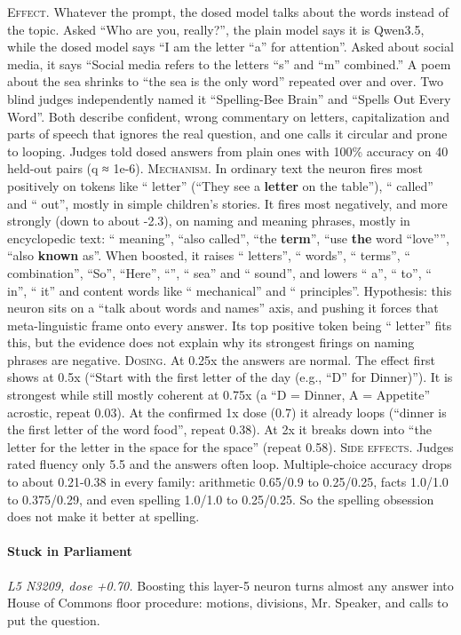 \noindent\textsc{Effect.} Whatever the prompt, the dosed model talks about the words instead of the topic. Asked “Who are you, really?”, the plain model says it is Qwen3.5, while the dosed model says “I am the letter “a” for attention”. Asked about social media, it says “Social media refers to the letters “s” and “m” combined.” A poem about the sea shrinks to “the sea is the only word” repeated over and over. Two blind judges independently named it “Spelling-Bee Brain” and “Spells Out Every Word”. Both describe confident, wrong commentary on letters, capitalization and parts of speech that ignores the real question, and one calls it circular and prone to looping. Judges told dosed answers from plain ones with 100\% accuracy on 40 held-out pairs (q ≈ 1e-6). \textsc{Mechanism.} In ordinary text the neuron fires most positively on tokens like “ letter” (“They see a\textbf{ letter} on the table”), “ called” and “ out”, mostly in simple children's stories. It fires most negatively, and more strongly (down to about -2.3), on naming and meaning phrases, mostly in encyclopedic text: “ meaning”, “also called”, “the\textbf{ term}”, “use\textbf{ the} word “love””, “also\textbf{ known} as”. When boosted, it raises “ letters”, “ words”, “ terms”, “ combination”, “So”, “Here”, “”, “ sea” and “ sound”, and lowers “ a”, “ to”, “ in”, “ it” and content words like “ mechanical” and “ principles”. Hypothesis: this neuron sits on a “talk about words and names” axis, and pushing it forces that meta-linguistic frame onto every answer. Its top positive token being “ letter” fits this, but the evidence does not explain why its strongest firings on naming phrases are negative. \textsc{Dosing.} At 0.25x the answers are normal. The effect first shows at 0.5x (“Start with the first letter of the day (e.g., “D” for Dinner)”). It is strongest while still mostly coherent at 0.75x (a “D = Dinner, A = Appetite” acrostic, repeat 0.03). At the confirmed 1x dose (0.7) it already loops (“dinner is the first letter of the word food”, repeat 0.38). At 2x it breaks down into “the letter for the letter in the space for the space” (repeat 0.58). \textsc{Side effects.} Judges rated fluency only 5.5 and the answers often loop. Multiple-choice accuracy drops to about 0.21-0.38 in every family: arithmetic 0.65/0.9 to 0.25/0.25, facts 1.0/1.0 to 0.375/0.29, and even spelling 1.0/1.0 to 0.25/0.25. So the spelling obsession does not make it better at spelling.

\paragraph{Stuck in Parliament} \textit{L5 N3209, dose +0.70.} Boosting this layer-5 neuron turns almost any answer into House of Commons floor procedure: motions, divisions, Mr. Speaker, and calls to put the question.

